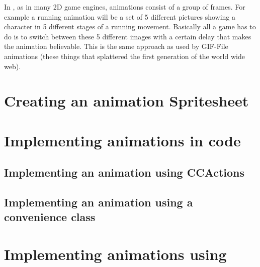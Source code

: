 In \cocos{}, as in many 2D game engines, animations consist of a group of
frames. For example a running animation will be a set of 5 different pictures
showing a character in 5 different stages of a running movement. Basically all a
game has to do is to switch between these 5 different images with a certain
delay that makes the animation believable. This is the same approach as used by
GIF-File animations (these things that splattered the first generation of the
world wide web).

\section{Creating an animation Spritesheet}
\section{Implementing animations in code}
\subsection{Implementing an animation using CCActions}
\subsection{Implementing an animation using a convenience class}
\section{Implementing animations using \spriteb{}}

